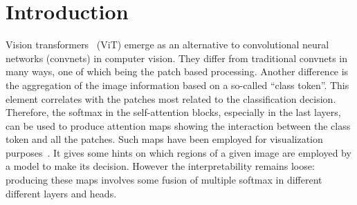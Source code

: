 
\section{Introduction}

Vision transformers~\cite{dosovitskiy2020image} (ViT) emerge as an alternative to convolutional neural networks (convnets) in computer vision. 
%
They differ from traditional convnets in many ways, one of which being the patch based processing. Another difference is the aggregation of the image information based on a so-called ``class token''. 
This element correlates with the patches most related to the classification decision. Therefore, the softmax in the self-attention blocks, especially in the last layers, can be used to produce attention maps showing the interaction between the class token and all the patches. 
%
Such maps have been employed for visualization purposes~\cite{caron2021emerging,dosovitskiy2020image}. It gives some hints on which regions of a given image  are employed by a model to make its decision. 
% 
However the interpretability remains loose: producing these maps involves some fusion of multiple softmax in different different layers and heads. 

%
% 
%

